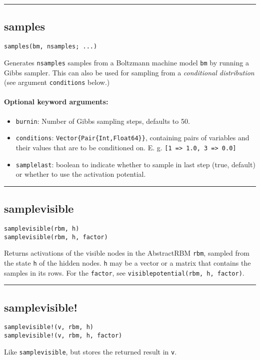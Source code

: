 \noindent\rule{\textwidth}{1pt}
\subsection*{samples}  \label{bms_samples}
\begin{verbatim}
samples(bm, nsamples; ...)
\end{verbatim}
Generates \texttt{nsamples} samples from a Boltzmann machine model \texttt{bm} by running a Gibbs sampler. This can also be used for sampling from a \emph{conditional distribution} (see argument \texttt{conditions} below.)

\paragraph*{Optional keyword arguments:}
\begin{itemize}
\item \texttt{burnin}: Number of Gibbs sampling steps, defaults to 50.


\item \texttt{conditions}: \texttt{Vector\{Pair\{Int,Float64\}\}}, containing pairs of variables and their values that are to be conditioned on. E. g. \texttt{[1 => 1.0, 3 => 0.0]}


\item \texttt{samplelast}: boolean to indicate whether to sample in last step (true, default) or whether to use the activation potential.

\end{itemize}
\noindent\rule{\textwidth}{1pt}
\subsection*{samplevisible}  \label{bms_samplevisible}
\begin{verbatim}
samplevisible(rbm, h)
samplevisible(rbm, h, factor)
\end{verbatim}
Returns activations of the visible nodes in the AbstractRBM \texttt{rbm}, sampled from the state \texttt{h} of the hidden nodes. \texttt{h} may be a vector or a matrix that contains the samples in its rows. For the \texttt{factor}, see \texttt{visiblepotential(rbm, h, factor)}.

\noindent\rule{\textwidth}{1pt}
\subsection*{samplevisible!}  \label{bms_samplevisible!}
\begin{verbatim}
samplevisible!(v, rbm, h)
samplevisible!(v, rbm, h, factor)
\end{verbatim}
Like \texttt{samplevisible}, but stores the returned result in \texttt{v}.

